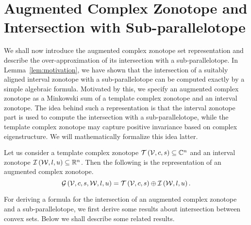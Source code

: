 \section{Augmented Complex Zonotope and Intersection with Sub-parallelotope}
We shall now introduce the augmented complex zonotope set
representation and describe the over-approximation of its intersection
with a sub-parallelotope.  In Lemma~\ref{lem:motivation}, we have shown that the
intersection of a suitably aligned interval zonotope with a
sub-parallelotope can be computed exactly by a simple algebraic
formula.  Motivated by this, we specify an augmented complex zonotope
as a Minkowski sum of a template complex zonotope and an interval
zonotope.  The idea behind such a representation is that the interval
zonotope part is used to compute the intersection with a
sub-parallelotope, while the template complex zonotope may capture
positive invariance based on complex eigenstructure.  We will
mathematically formalize this idea latter.
%
\begin{definition}
Let us consider a template complex zonotope
$\mathit{\operatorname{\mathcal{T}}}\left(\mathcal{V},c,s\right)\subseteq\mathbb{C}^n$ and an interval
zonotope $\mathit{\operatorname{\mathcal{I}}}\left(\mathcal{W},l,u\right)\subseteq\mathbb{R}^n$.  Then the
following is the representation of an augmented complex zonotope.
%
\[
\mathcal{G}\left(\mathcal{V},c,s,\mathcal{W},l,u\right)=\mathit{\operatorname{\mathcal{T}}}\left(\mathcal{V},c,s\right)\oplus \mathit{\operatorname{\mathcal{I}}}\left(\mathcal{W},l,u\right).
\]
%
\end{definition}
%
For deriving a formula for the intersection of an augmented complex
zonotope and a sub-parallelotope, we first derive some results about
intersection between convex sets.  Below we shall describe some
related results.

